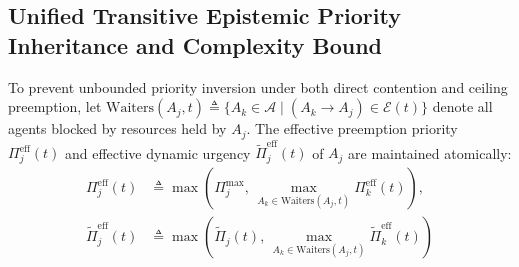 \documentclass[conference,10pt]{IEEEtran}
\begin{document}
\subsection{Unified Transitive Epistemic Priority Inheritance and Complexity Bound}
To prevent unbounded priority inversion under both direct contention and ceiling preemption, let $\text{Waiters}(A_j, t) \triangleq \{A_k \in \mathcal{A} \mid (A_k \to A_j) \in \mathcal{E}(t)\}$ denote all agents blocked by resources held by $A_j$. The effective preemption priority $\Pi_j^{\text{eff}}(t)$ and effective dynamic urgency $\tilde{\Pi}_j^{\text{eff}}(t)$ of $A_j$ are maintained atomically:
\begin{align}
\label{eq:inheritance}
\Pi_j^{\text{eff}}(t) &\triangleq \max \left( \Pi_j^{\max},\, \max_{A_k \in \text{Waiters}(A_j, t)} \Pi_k^{\text{eff}}(t) \right), \\
\label{eq:inheritance_dyn}
\tilde{\Pi}_j^{\text{eff}}(t) &\triangleq \max \left( \tilde{\Pi}_j(t),\, \max_{A_k \in \text{Waiters}(A_j, t)} \tilde{\Pi}_k^{\text{eff}}(t) \right)
\end{align}
\end{document}

